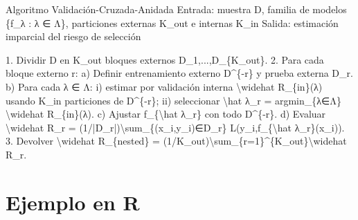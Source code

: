 \documentclass[
  spanish,
  10.5pt,
  letterpaper,
  DIV=11,
  numbers=noendperiod,
  oneside,
  open=any]{scrreprt}
\newenvironment{Shaded}{\begin{snugshade}}{\end{snugshade}}
\newcommand{\NormalTok}[1]{\textcolor[rgb]{0.00,0.23,0.31}{#1}}
\theoremstyle{definition}
\theoremstyle{definition}
\theoremstyle{plain}
\theoremstyle{remark}
\begin{document}
\begin{tcolorbox}[enhanced jigsaw, arc=.35mm, bottomrule=.15mm, bottomtitle=1mm, breakable, colback=white, colbacktitle=quarto-callout-note-color!10!white, colframe=quarto-callout-note-color-frame, coltitle=black, left=2mm, leftrule=.75mm, opacityback=0, opacitybacktitle=0.6, rightrule=.15mm, title=\textcolor{quarto-callout-note-color}{\faInfo}\hspace{0.5em}{Seudocódigo matemático formal}, titlerule=0mm, toprule=.15mm, toptitle=1mm]

\begin{Shaded}
\begin{Highlighting}[numbers=left,,]
\NormalTok{Algoritmo Validación{-}Cruzada{-}Anidada}
\NormalTok{Entrada:}
\NormalTok{  muestra D, familia de modelos \{f\_λ : λ ∈ Λ\},}
\NormalTok{  particiones externas K\_out e internas K\_in}
\NormalTok{Salida:}
\NormalTok{  estimación imparcial del riesgo de selección}

\NormalTok{1. Dividir D en K\_out bloques externos D\_1,...,D\_\{K\_out\}.}
\NormalTok{2. Para cada bloque externo r:}
\NormalTok{   a) Definir entrenamiento externo D\^{}\{{-}r\} y prueba externa D\_r.}
\NormalTok{   b) Para cada λ ∈ Λ:}
\NormalTok{      i) estimar por validación interna}
\NormalTok{            \textbackslash{}widehat R\_\{in\}(λ)}
\NormalTok{         usando K\_in particiones de D\^{}\{{-}r\};}
\NormalTok{      ii) seleccionar}
\NormalTok{            \textbackslash{}hat λ\_r = argmin\_\{λ∈Λ\} \textbackslash{}widehat R\_\{in\}(λ).}
\NormalTok{   c) Ajustar f\_\{\textbackslash{}hat λ\_r\} con todo D\^{}\{{-}r\}.}
\NormalTok{   d) Evaluar}
\NormalTok{         \textbackslash{}widehat R\_r =}
\NormalTok{         (1/|D\_r|)\textbackslash{}sum\_\{(x\_i,y\_i)∈D\_r\}}
\NormalTok{         L(y\_i,f\_\{\textbackslash{}hat λ\_r\}(x\_i)).}
\NormalTok{3. Devolver}
\NormalTok{      \textbackslash{}widehat R\_\{nested\}}
\NormalTok{      = (1/K\_out)\textbackslash{}sum\_\{r=1\}\^{}\{K\_out\}\textbackslash{}widehat R\_r.}
\end{Highlighting}
\end{Shaded}

\end{tcolorbox}

\section*{Ejemplo en R}\label{ejemplo-en-r}

\end{document}
